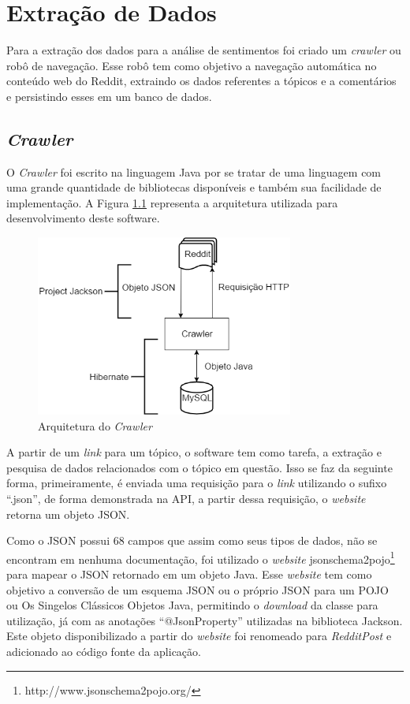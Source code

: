 \chapter{Extração de Dados}
\label{cap:Extracao}

Para a extração dos dados para a análise de sentimentos foi criado um
\textit{crawler} ou robô de navegação. Esse robô tem como objetivo a navegação
automática no conteúdo web do Reddit, extraindo os dados referentes a tópicos e
a comentários e persistindo esses em um banco de dados.

\section{\textit{Crawler}}

O \textit{Crawler} foi escrito na linguagem Java por se tratar de uma linguagem
com uma grande quantidade de bibliotecas disponíveis e também
sua facilidade de implementação. A Figura \ref{fig:crawler} representa a
arquitetura utilizada para desenvolvimento deste software.

\begin{figure}[htbp]
\centering
\includegraphics[height=225px]{imagens/arquitetura.png}
\caption{Arquitetura do \textit{Crawler}}
\label{fig:crawler}
\end{figure}

A partir de um \textit{link} para um tópico, o software tem como tarefa, a
extração e pesquisa de dados relacionados com o tópico em questão. Isso se faz
da seguinte forma, primeiramente, é enviada uma requisição para o \textit{link}
utilizando o sufixo ``.json'', de forma demonstrada na API, a partir dessa
requisição, o \textit{website} retorna um objeto \ac{JSON}.

Como o \ac{JSON} possui 68 campos que assim como seus tipos de dados, não se
encontram em nenhuma documentação, foi utilizado o \textit{website}
jsonschema2pojo\footnote{http://www.jsonschema2pojo.org/} para mapear o \ac{JSON} retornado em um
objeto Java. Esse \textit{website} tem como objetivo a conversão de um esquema \ac{JSON} ou o próprio \ac{JSON} para um \ac{POJO} ou Os Singelos Clássicos Objetos Java, permitindo
o \textit{download} da classe para utilização, já com as anotações
``@JsonProperty'' utilizadas na biblioteca Jackson. Este objeto disponibilizado a
partir do \textit{website} foi renomeado para \textit{RedditPost} e adicionado
ao código fonte da aplicação.

